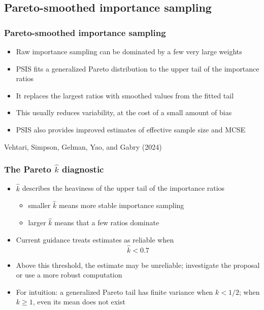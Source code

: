 \documentclass[10pt]{beamer}
\begin{document}
\subsection{Pareto-smoothed importance sampling}

\begin{frame}

\frametitle{Pareto-smoothed importance sampling}

  \begin{itemize}
  \item Raw importance sampling can be dominated by a few very large weights
  \pause
  \item PSIS fits a generalized Pareto distribution to the upper tail
    of the importance ratios
  \item It replaces the largest ratios with smoothed values from the fitted tail
  \pause
  \item This usually reduces variability, at the cost of a small amount of bias
  \item PSIS also provides improved estimates of effective sample size and MCSE
  \end{itemize}

  \vfill
  {\tiny Vehtari, Simpson, Gelman, Yao, and Gabry (2024)}
\end{frame}

\begin{frame}

\frametitle{The Pareto $\widehat{k}$ diagnostic}

  \begin{itemize}
  \item $\widehat{k}$ describes the heaviness of the upper tail of the
    importance ratios
    \begin{itemize}
      \item smaller $\widehat{k}$ means more stable importance sampling
      \item larger $\widehat{k}$ means that a few ratios dominate
    \end{itemize}
  \pause
  \item Current guidance treats estimates as reliable when
    \[
      \widehat{k}<0.7
    \]
  \item<3-> Above this threshold, the estimate may be unreliable;
    investigate the proposal or use a more robust computation
  \item<4-> For intuition: a generalized Pareto tail has finite variance
    when $k<1/2$; when $k\geq1$, even its mean does not exist
  \end{itemize}

\end{frame}
\end{document}
